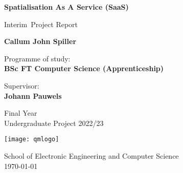 
\newcommand{\reportversion}{Interim}

\begin{titlepage}
    \begin{center}
        \vspace*{1cm}

        \huge
        \textbf{Spatialisation As A Service (SaaS)}

        \vspace{0.5cm}

        \large
        \reportversion~Project Report

        \vspace{1.5cm}

        \LARGE
        \textbf{Callum John Spiller}

        \vspace{1.5cm}

        \small
        Programme of study:\\
        \textbf{BSc FT Computer Science (Apprenticeship)}

        \vspace{1cm}

        Supervisor:\\
        \textbf{Johann Pauwels}

        \vfill

        \footnotesize
        Final Year\\
        Undergraduate Project 2022/23

        \vspace{0.5cm}
        \texttt{[image: qmlogo]}
        \vspace{0.5cm}

        School of Electronic Engineering and Computer Science\\
        \today

    \end{center}
\end{titlepage}